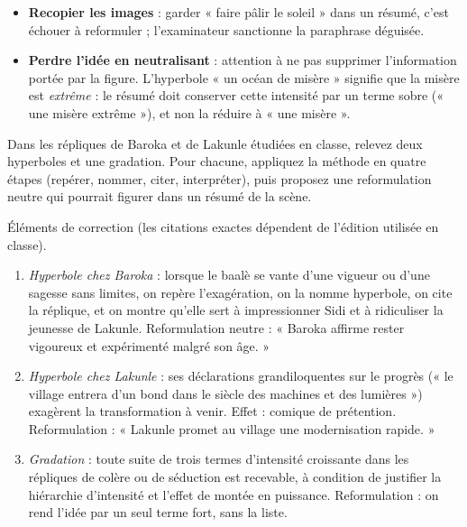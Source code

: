 \documentclass[11pt]{article}
\begin{document}
\begin{attention}
\begin{itemize}
\item \textbf{Recopier les images} : garder « faire pâlir le soleil » dans un résumé, c'est échouer à reformuler ; l'examinateur sanctionne la paraphrase déguisée.
\item \textbf{Perdre l'idée en neutralisant} : attention à ne pas supprimer l'information portée par la figure. L'hyperbole « un océan de misère » signifie que la misère est \emph{extrême} : le résumé doit conserver cette intensité par un terme sobre (« une misère extrême »), et non la réduire à « une misère ».
\end{itemize}
\end{attention}

\begin{exercice}
Dans les répliques de Baroka et de Lakunle étudiées en classe, relevez deux hyperboles et une gradation. Pour chacune, appliquez la méthode en quatre étapes (repérer, nommer, citer, interpréter), puis proposez une reformulation neutre qui pourrait figurer dans un résumé de la scène.
\end{exercice}

\begin{corrige}[Exercice 1]
Éléments de correction (les citations exactes dépendent de l'édition utilisée en classe).
\begin{enumerate}
\item \emph{Hyperbole chez Baroka} : lorsque le baalè se vante d'une vigueur ou d'une sagesse sans limites, on repère l'exagération, on la nomme hyperbole, on cite la réplique, et on montre qu'elle sert à impressionner Sidi et à ridiculiser la jeunesse de Lakunle. Reformulation neutre : « Baroka affirme rester vigoureux et expérimenté malgré son âge. »
\item \emph{Hyperbole chez Lakunle} : ses déclarations grandiloquentes sur le progrès (« le village entrera d'un bond dans le siècle des machines et des lumières ») exagèrent la transformation à venir. Effet : comique de prétention. Reformulation : « Lakunle promet au village une modernisation rapide. »
\item \emph{Gradation} : toute suite de trois termes d'intensité croissante dans les répliques de colère ou de séduction est recevable, à condition de justifier la hiérarchie d'intensité et l'effet de montée en puissance. Reformulation : on rend l'idée par un seul terme fort, sans la liste.
\end{enumerate}
\end{corrige}
\end{document}
